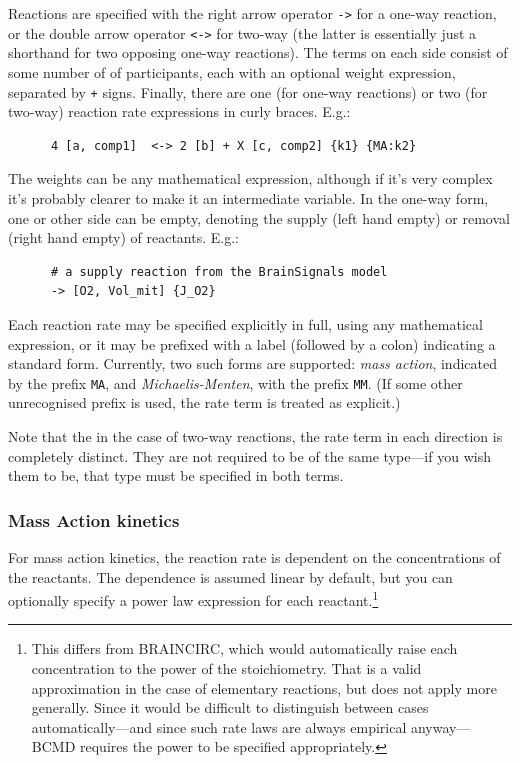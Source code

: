 \documentclass[a4paper,11pt]{article}
\begin{document}
Reactions are specified with the right arrow operator \texttt{->} for a one-way reaction, or the double arrow operator \texttt{<->} for two-way (the latter is essentially just a shorthand for two opposing one-way reactions). The terms on each side consist of some number of of participants, each with an optional weight expression, separated by \texttt{+} signs. Finally, there are one (for one-way reactions) or two (for two-way) reaction rate expressions in curly braces. E.g.:
\begin{verbatim}
      4 [a, comp1]  <-> 2 [b] + X [c, comp2] {k1} {MA:k2}
\end{verbatim}
The weights can be any mathematical expression, although if it's very complex it's probably clearer to make it an intermediate variable. In the one-way form, one or other side can be empty, denoting the supply (left hand empty) or removal (right hand empty) of reactants. E.g.:
\begin{verbatim}
      # a supply reaction from the BrainSignals model
      -> [O2, Vol_mit] {J_O2}
\end{verbatim}
Each reaction rate may be specified explicitly in full, using any mathematical expression, or it may be prefixed with a label (followed by a colon) indicating a standard form. Currently, two such forms are supported: \textit{mass action}, indicated by the prefix \texttt{MA}, and \textit{Michaelis-Menten}, with the prefix \texttt{MM}. (If some other unrecognised prefix is used, the rate term is treated as explicit.)

Note that the in the case of two-way reactions, the rate term in each direction is completely distinct. They are not required to be of the same type---if you wish them to be, that type must be specified in both terms.

\subsubsection{Mass Action kinetics}\label{mak}

For mass action kinetics, the reaction rate is dependent on the concentrations of the reactants. The dependence is assumed linear by default, but you can optionally specify a power law expression for each reactant.\footnote{This differs from BRAINCIRC, which would automatically raise each concentration to the power of the stoichiometry. That is a valid approximation in the case of elementary reactions, but does not apply more generally. Since it would be difficult to distinguish between cases automatically---and since such rate laws are always empirical anyway---BCMD requires the power to be specified appropriately.}
\end{document}
